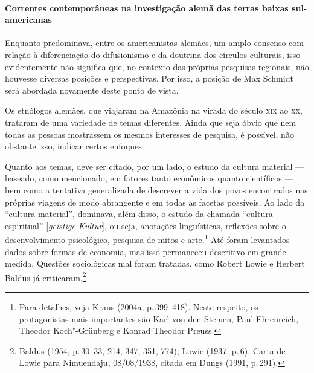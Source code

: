 \paragraph{Correntes contemporâneas na investigação alemã das terras baixas sul-americanas} Enquanto predominava, entre os americanistas alemães, um amplo consenso
com relação à diferenciação do difusionismo e da doutrina dos círculos
culturais, isso evidentemente não significa que, no contexto das
próprias pesquisas regionais, não houvesse diversas posições e
perspectivas. Por isso, a posição de Max Schmidt será abordada
novamente deste ponto de vista.

Os etnólogos alemães, que viajaram na Amazônia na virada do século \textsc{xix}
ao \textsc{xx}, trataram de uma variedade de temas diferentes. Ainda que seja
óbvio que nem todas as pessoas mostrassem os mesmos interesses de
pesquisa, é possível, não obstante isso, indicar certos enfoques.

Quanto aos temas, deve ser citado, por um lado, o estudo da cultura
material --- baseado, como mencionado, em fatores tanto econômicos quanto
científicos --- bem como a tentativa generalizada de descrever a vida dos
povos encontrados nas próprias viagens de modo abrangente e em todas as
facetas possíveis. Ao lado da ``cultura material'', dominava, além
disso, o estudo da chamada ``cultura espiritual'' {[}\textit{geistige
Kultur}{]}, ou seja, anotações linguísticas, reflexões sobre o
desenvolvimento psicológico, pesquisa de mitos e arte.\footnote{Para
  detalhes, veja Kraus (2004a, p.\,399--418). Neste respeito, os
  protagonistas mais importantes são Karl von den Steinen, Paul
  Ehrenreich, Theodor Koch"-Grünberg e Konrad Theodor Preuss.} Até foram
levantados dados sobre formas de economia, mas isso permaneceu
descritivo em grande medida. Questões sociológicas mal foram tratadas,
como Robert Lowie e Herbert Baldus já criticaram.\footnote{Baldus (1954,
  p.\,30--33, 214, 347, 351, 774), Lowie (1937, p.\,6). Carta de Lowie para
  Nimuendaju, 08/08/1938, citada em Dungs (1991, p.\,291).}

